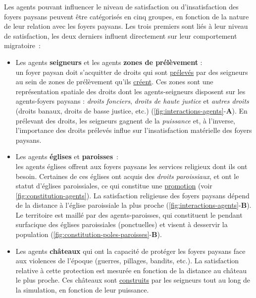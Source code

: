 Les agents pouvant influencer le niveau de satisfaction ou d'insatisfaction des foyers paysans peuvent être catégorisés en cinq groupes, en fonction de la nature de leur relation avec les foyers paysans.
Les trois premiers sont liés à leur niveau de satisfaction, les deux derniers influent directement sur leur comportement migratoire :
\begin{itemize}
	\item Les agents \og \textbf{seigneurs}\fg{} et les agents \og \textbf{zones de prélèvement}\fg{} : \\
	un foyer paysan doit s'acquitter de droits qui sont \ul{prélevés} par des seigneurs au sein de zones de prélèvement qu'ils \ul{créent}.
	Ces zones sont une représentation spatiale des droits dont les agents-seigneurs disposent sur les agents-foyers paysans :
		\textit{droits fonciers}, \textit{droits de haute justice} et \textit{autres droits} (droits banaux, droits de basse justice, etc.) (\cref{fig:interactions-agents}-\textbf{A}).
	En prélevant des droits, les seigneurs gagnent de la \textit{puissance} et, à l'inverse, l'importance des droits prélevés influe sur l'insatisfaction matérielle des foyers paysans.
	
	\item Les agents \og \textbf{églises}\fg{} et \og \textbf{paroisses}\fg{} : \\
	les agents \og églises\fg{} offrent aux foyers paysans les services religieux dont ils ont besoin.
	Certaines de ces églises ont acquis des \textit{droits paroissiaux}, et ont le statut d'églises paroissiales, ce qui constitue une \ul{promotion} (voir \cref{fig:constitution-agents}).
	La satisfaction religieuse des foyers paysans dépend de la distance à l'église paroissiale la plus proche (\cref{fig:interactions-agents}-\textbf{B}).
	Le territoire est maillé par des agents-paroisses, qui constituent le pendant surfacique des églises paroissiales (ponctuelles) et visent à desservir la population (\cref{fig:constitution-poles-paroisses}-\textbf{B}).
	
	\item Les agents \og \textbf{châteaux}\fg{} qui ont la capacité de protéger les foyers paysans face aux violences de l'époque (guerres, pillages, bandits, etc.).
	La satisfaction relative à cette protection est mesurée en fonction de la distance au château le plus proche.
	Ces châteaux sont \ul{construits} par les seigneurs tout au long de la simulation, en fonction de leur puissance.
	

\end{itemize}
